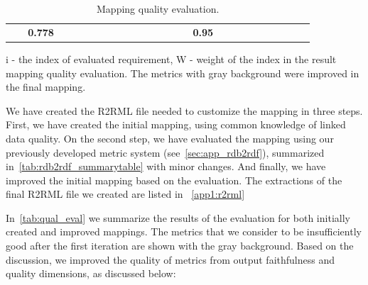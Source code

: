 \documentclass[ngerman,UKenglish,table]{scrbook}
\begin{document}
\begin{table}[!ht]
\begin{tabular}{p{0.05\linewidth}|p{0.28\linewidth}|p{0.11\linewidth}|p{0.09\linewidth}|p{0.06\linewidth}|p{0.11\linewidth}|p{0.09\linewidth}|p{0.06\linewidth}}
\rowcolor[gray]{.7}
\hline
\multicolumn{4}{r|}{\textbf{Total}}& \textbf{0.778}  & & & \textbf{0.95} \\

\end{tabular}
\caption{Mapping quality evaluation.}
\label{tab:qual_eval}
\scriptsize{i - the index of evaluated requirement, W - weight of the index in the result mapping quality evaluation. The metrics with gray background were improved in the final mapping.}

\end{table}

We have created the R2RML file needed to customize the mapping in three steps.
First, we have created the initial mapping, using common knowledge of linked data quality.
On the second step, we have evaluated the mapping using our previously developed metric system (see~\autoref{sec:app_rdb2rdf}), summarized in~\autoref{tab:rdb2rdf_summarytable} with minor changes.
And finally, we have improved the initial mapping based on the evaluation.
The extractions of the final R2RML file we created are listed in ~\autoref{app1:r2rml}

In~\autoref{tab:qual_eval} we summarize the results of the evaluation for both initially created and improved mappings.
The metrics that we consider to be insufficiently good after the first iteration are shown with the gray background.
Based on the discussion, we improved the quality of metrics from output faithfulness and quality dimensions, as discussed below:
\end{document}
